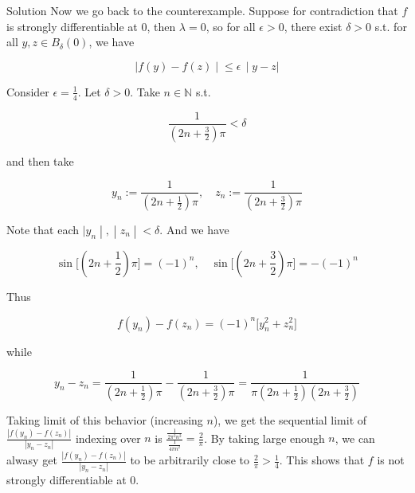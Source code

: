 \documentclass{qlnotes-export}
\begin{document}
\begin{qlsolution}{Solution}
Now we go back to the counterexample. Suppose for contradiction that \(f\) is strongly differentiable at \(0\), then \(\lambda = 0\), so for all \(\epsilon > 0\), there exist \(\delta > 0\) s.t. for all \(y,z \in B_{\delta}(0)\), we have

\[\left. |f(y) - f(z) \middle| \leq \epsilon\, \middle| y - z| \right.\]

Consider \(\epsilon = \frac{1}{4}\). Let \(\delta > 0\). Take \(n \in {\mathbb{N}}\) s.t.

\[\frac{1}{(2n + \frac{3}{2})\pi} < \delta\]

and then take

\[y_{n} := \frac{1}{\left( {2n + \frac{1}{2}} \right)\pi},\quad z_{n} := \frac{1}{\left( {2n + \frac{3}{2}} \right)\pi}\]

Note that each \(\left. |y_{n} \middle| , \middle| z_{n} \middle| < \delta \right.\). And we have

\[\sin\lbrack(2n + \frac{1}{2})\pi\rbrack = ( - 1)^{n},\quad\sin\lbrack(2n + \frac{3}{2})\pi\rbrack = - ( - 1)^{n}\]

Thus

\[f(y_{n}) - f(z_{n}) = ( - 1)^{n}\lbrack y_{n}^{2} + z_{n}^{2}\rbrack\]

while

\[y_{n} - z_{n} = \frac{1}{\left( {2n + \frac{1}{2}} \right)\pi} - \frac{1}{\left( {2n + \frac{3}{2}} \right)\pi} = \frac{1}{\pi\left( {2n + \frac{1}{2}} \right)\left( {2n + \frac{3}{2}} \right)}\]

Taking limit of this behavior (increasing \(n\)), we get the sequential limit of \(\frac{|f(y_{n}) - f(z_{n})|}{|y_{n} - z_{n}|}\) indexing over \(n\) is \(\frac{\frac{1}{2\pi^{2}n^{2}}}{\frac{1}{4\pi n^{2}}} = \frac{2}{\pi}\). By taking large enough \(n\), we can alwasy get \(\frac{|f(y_{n}) - f(z_{n})|}{|y_{n} - z_{n}|}\) to be arbitrarily close to \(\frac{2}{\pi} > \frac{1}{4}\). This shows that \(f\) is not strongly differentiable at \(0\).

\end{qlsolution}
\end{document}
